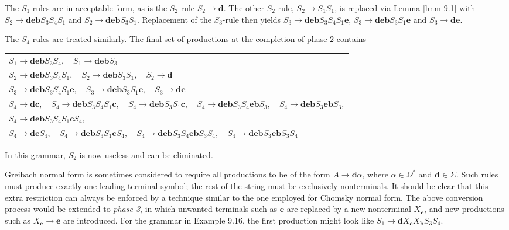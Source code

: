 The $S_1$-rules are in acceptable form, as is the $S_2$-rule $S_2\rightarrow
\pmb{d}$. The other $S_2$-rule, $S_2\rightarrow S_1S_1$, is replaced via Lemma
\ref{lmm-9.1} with $S_2 \rightarrow \pmb{deb}S_3S_4S_1$ and $S_2\rightarrow\pmb{deb}S_3S_1$.
Replacement of the $S_3$-rule then yields $S_3\rightarrow\pmb{deb}S_3S_4S_1
\pmb{e}$, $S_3\rightarrow\pmb{deb}S_3S_1\pmb{e}$ and $S_3\rightarrow\pmb{de}$.

The $S_4$ rules are treated similarly. The final set of productions at the
completion of phase 2 contains
\begin{center}\begin{tabular}{l}
$S_1\rightarrow\pmb{deb}S_3S_4,\quad S_1\rightarrow\pmb{deb}S_3$ \\
$S_2\rightarrow\pmb{deb}S_3S_4S_1,\quad S_2 \rightarrow \pmb{deb}S_3S_1,\quad
	S_2\rightarrow\pmb{d}$ \\
$S_3\rightarrow\pmb{deb}S_3S_4S_1\pmb{e},\quad S_3\rightarrow\pmb{deb}S_3S_1
	\pmb{e},\quad S_3\rightarrow\pmb{de}$ \\
$S_4\rightarrow\pmb{dc},\quad S_4\rightarrow\pmb{deb}S_3S_4S_1\pmb{c},\quad
	S_4\rightarrow\pmb{deb}S_3S_1\pmb{c},\quad S_4\rightarrow\pmb{deb}S_3
	S_4\pmb{eb}S_3,\quad S_4\rightarrow\pmb{deb}S_3\pmb{eb}S_3,$ \\
$S_4\rightarrow\pmb{deb}S_3S_4S_1\pmb{c}S_4,$ \\
$S_4\rightarrow\pmb{dc}S_4,\quad S_4\rightarrow\pmb{deb}S_3S_1\pmb{c}S_4,\quad
	S_4\rightarrow\pmb{deb}S_3S_4\pmb{eb}S_3S_4,\quad S_4\rightarrow
	\pmb{deb}S_3\pmb{eb}S_3S_4$
\end{tabular}\end{center}
In this grammar, $S_2$ is now useless and can be eliminated.

Greibach normal form is sometimes considered to require all productions to be of
the form $A\rightarrow\pmb{d}\alpha$, where $\alpha\in\Omega^*$ and $\pmb{d}\in
\Sigma$. Such rules must produce exactly one leading terminal symbol; the rest
of the string must be exclusively nonterminals. It should be clear that this
extra restriction can always be enforced by a technique similar to the one
employed for Chomsky normal form. The above conversion process would be extended
to \emph{phase 3}, in which unwanted terminals such as $\pmb{e}$ are replaced by a
new nonterminal $X_{\pmb{e}}$, and new productions such as $X_{\pmb{e}}
\rightarrow \pmb{e}$ are introduced. For the grammar in Example 9.16, the first
production might look like $S_1\rightarrow\pmb{d}X_{\pmb{e}}X_{\pmb{b}}S_3S_4$.

